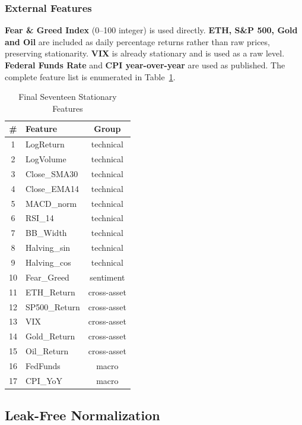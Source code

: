 \documentclass[12pt]{article}
\begin{document}
\subsubsection{External Features}

\textbf{Fear \& Greed Index} (0--100 integer) is used directly. \textbf{ETH, S\&P 500, Gold and Oil} are included as daily percentage returns rather than raw prices, preserving stationarity. \textbf{VIX} is already stationary and is used as a raw level. \textbf{Federal Funds Rate} and \textbf{CPI year-over-year} are used as published. The complete feature list is enumerated in Table~\ref{tab:features}.

\begin{table}[h!]
\centering
\small
\caption{Final Seventeen Stationary Features}
\label{tab:features}
\begin{tabular}{@{}clc@{}}
\toprule
\# & \textbf{Feature} & \textbf{Group} \\
\midrule
 1 & LogReturn          & technical \\
 2 & LogVolume          & technical \\
 3 & Close\_SMA30       & technical \\
 4 & Close\_EMA14       & technical \\
 5 & MACD\_norm         & technical \\
 6 & RSI\_14            & technical \\
 7 & BB\_Width          & technical \\
 8 & Halving\_sin       & technical \\
 9 & Halving\_cos       & technical \\
10 & Fear\_Greed        & sentiment \\
11 & ETH\_Return        & cross-asset \\
12 & SP500\_Return      & cross-asset \\
13 & VIX                & cross-asset \\
14 & Gold\_Return       & cross-asset \\
15 & Oil\_Return        & cross-asset \\
16 & FedFunds           & macro \\
17 & CPI\_YoY           & macro \\
\bottomrule
\end{tabular}
\end{table}

\subsection{Leak-Free Normalization}
\label{sec:leak-free}
\end{document}
